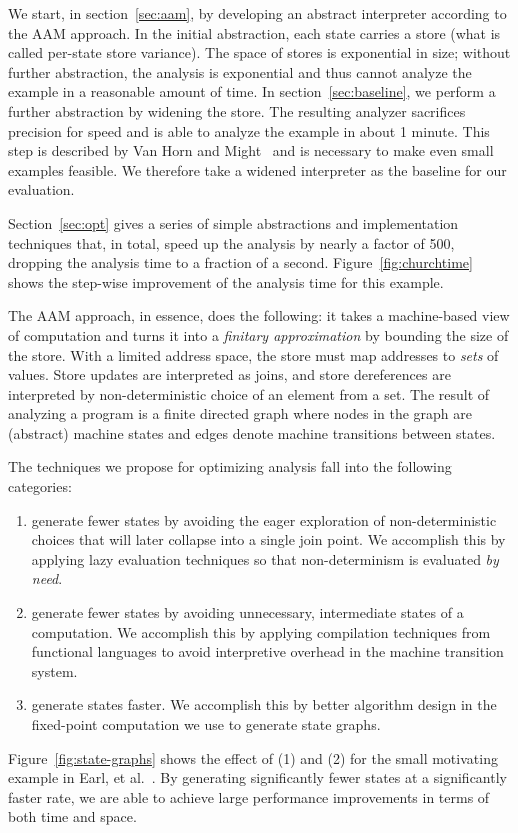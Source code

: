 \documentclass[preprint,onecolumn,9pt]{sigplanconf} %
\begin{document}
We start, in section~\ref{sec:aam}, by developing an abstract interpreter according to the AAM approach.
%
In the initial abstraction, each state carries a store (what is called per-state store variance).
%
The space of stores is exponential in size; without further abstraction, the analysis is exponential and thus cannot analyze the example in a reasonable amount of time.
%
In section~\ref{sec:baseline}, we perform a further abstraction by widening the store.
%
The resulting analyzer sacrifices precision for speed and is able to analyze the example in about 1 minute.
%
This step is described by Van Horn and Might~\cite[\S 3.5--6]{dvanhorn:VanHorn2012Systematic} and is necessary to make even small examples feasible.
%
We therefore take a widened interpreter as the baseline for our evaluation.

Section~\ref{sec:opt} gives a series of simple abstractions and implementation techniques that, in total, speed up the analysis by nearly a factor of 500, dropping the analysis time to a fraction of a second.
%
Figure~\ref{fig:churchtime} shows the step-wise improvement of the analysis time for this example.

The AAM approach, in essence, does the following: it takes a machine-based view of computation and turns it into a \emph{finitary approximation} by bounding the size of the store.
%
With a limited address space, the store must map addresses to \emph{sets} of values.
%
Store updates are interpreted as joins, and store dereferences are interpreted by non-deterministic choice of an element from a set.
%
The result of analyzing a program is a finite directed graph where nodes in the graph are (abstract) machine states and edges denote machine transitions between states.

The techniques we propose for optimizing analysis fall into the following categories:
\begin{enumerate}
\item generate fewer states by avoiding the eager exploration of non-deterministic choices that will later collapse into a single join point.
%
  We accomplish this by applying lazy evaluation techniques so that non-determinism is evaluated \emph{by need}.

\item generate fewer states by avoiding unnecessary, intermediate states of a computation.
%
  We accomplish this by applying compilation techniques from functional languages to avoid interpretive overhead in the machine transition system.

\item generate states faster.
%
  We accomplish this by better algorithm design in the fixed-point computation we use to generate state graphs.
\end{enumerate}
%
Figure~\ref{fig:state-graphs} shows the effect of (1) and (2) for the small motivating example in Earl, et al.~\cite{dvanhorn:Earl2012Introspective}.
%
By generating significantly fewer states at a significantly faster rate, we are able to achieve large performance improvements in terms of both time and space.
\end{document}
